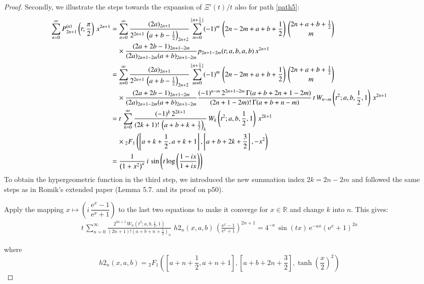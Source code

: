 \documentclass[a4paper,11pt,twoside]{amsart}
\newcommand{\verifiedeq}{=}
\newcommand{\defeq}{=}
\newcommand{\verifiedeq}{\stackrel{\checkmark}{=}}
\newcommand{\defeq}{\stackrel{\scriptscriptstyle \textnormal{def}}{=}}
\begin{document}
\begin{proof}
Secondly, we illustrate the steps towards the expansion of $\Xi'(t)/t$ also for path \ref{path5}: 
\begin{align}
 \sum_{n=0}^\infty P_{2n+1}^{(a)}\left(t;\frac{\pi}{2}\right)\,x^{2n+1} &\defeq\sum_{n=0}^\infty \frac{(2a)_{2n+1}}{2^{2n+1}\,\left(a+b-\frac12\right)_{2n+2}} \sum_{m=0}^{\lfloor n+\frac12 \rfloor} (-1)^m\,\left(2n-2m+a+b+\frac12\right)\,\binom{2n+a+b+\frac12}{m}\, \notag\\ &\quad\times \frac{(2a+2b-1)_{2n+1-2m}}{(2a)_{2n+1-2m}(a+b)_{2n+1-2m}}  p_{2n+1-2m}(t;a,b,a,b)\,x^{2n+1} \notag \\
 &\defeq\sum_{n=0}^\infty \frac{(2a)_{2n+1}}{2^{2n+1}\,\left(a+b-\frac12\right)_{2n+2}} \sum_{m=0}^{\lfloor n+\frac12 \rfloor} (-1)^m\,\left(2n-2m+a+b+\frac12\right)\,\binom{2n+a+b+\frac12}{m}\, \notag \\ &\quad\times\frac{(2a+2b-1)_{2n+1-2m}}{(2a)_{2n+1-2m}(a+b)_{2n+1-2m}} \frac{(-1)^{n-m}\,2^{2n+1-2m}\,\Gamma(a+b+2n+1-2m)}{(2n+1-2m)!\,\Gamma(a+b+n-m)}\,t\,W_{n-m}\left(t^2;a,b,\frac12,1\right)\,x^{2n+1}\notag \\
 &\defeq t\,\sum_{k=0}^\infty \frac{(-1)^k\,2^{2k+1}}{(2k+1)!\,\left(a+b+k+\frac12\right)_{k}}\,W_k\left(t^2;a,b,\frac12,1\right)\,x^{2k+1}\,\\ &\quad \times{}_2F_1\left(\left[a+k+\frac12, a+k+1\right],\left[a+b+2k+\frac32\right],-x^2\right) \notag \\
 &\defeq \frac{1}{\left(1+x^2\right)^a}\, i\,\sin\left(t\log\left(\frac{1-ix}{1+ix}\right)\right) 
\end{align}
To obtain the hypergeometric function in the third step, we introduced the new summation index $2k = 2n-2m$ and followed the same steps as in Romik's extended paper (Lemma 5.7. and its proof on p50). 

Apply the mapping $x \mapsto \left(i\,\dfrac{\textrm{e}^{x}-1}{\textrm{e}^{x}+1}\right)$ to the last two equations to make it converge for $x \in \mathbb{R}$ and change $k$ into $n$. This gives: 
\begin{align}
t\,\sum_{n=0}^\infty \frac{2^{2n+1}\,W_n\left(t^2;a,b,\frac12,1\right)}{(2n+1)!\left(a+b+n+\frac12\right)_n}\, \,h2_n(x,a,b)\,\left(\frac{\textrm{e}^{x}-1}{\textrm{e}^{x}+1}\right)^{2n+1} \verifiedeq 4^{-a}\,\sin(tx)\,\mathrm{e}^{-ax}\left(\mathrm{e}^x+1\right)^{2a} 
\end{align}

where $$h2_n(x,a,b) \defeq {}_2F_1\left(\left[a+n+\frac12, a+n+1\right],\left[a+b+2n+\frac32\right],\tanh\left(\frac{x}{2}\right)^2\right)$$


\end{proof}
\end{document}

